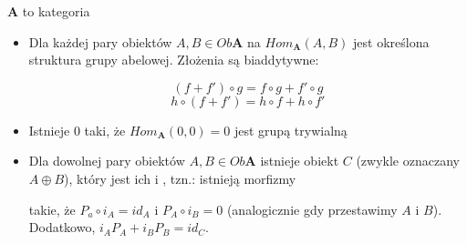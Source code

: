 \begin{definition}
   $\mathbf{A}$ to kategoria
  \begin{itemize}
    \item Dla każdej pary obiektów $A,B\in Ob\mathbf{A}$ na $Hom_{\mathbf{A}}(A, B)$ jest określona struktura grupy abelowej. Złożenia są biaddytywne:
      \begin{center}\end{center}
      $$(f+f')\circ g=f\circ g+f'\circ g$$
      $$h\circ(f+f')=h\circ f+h\circ f'$$
    \item Istnieje  $0$ taki, że $Hom_{\mathbf{A}}(0, 0)=0$ jest grupą trywialną
    \item Dla dowolnej pary obiektów $A, B\in Ob\mathbf{A}$ istnieje obiekt $C$ (zwykle oznaczany $A\oplus B$), który jest ich  i , tzn.: istnieją morfizmy
      \begin{center}\end{center}
      takie, że $P_a\circ i_A=id_A$ i $P_A\circ i_B=0$ (analogicznie gdy przestawimy $A$ i $B$). Dodatkowo, $i_AP_A+i_BP_B=id_C$.
  \end{itemize}
\end{definition}

